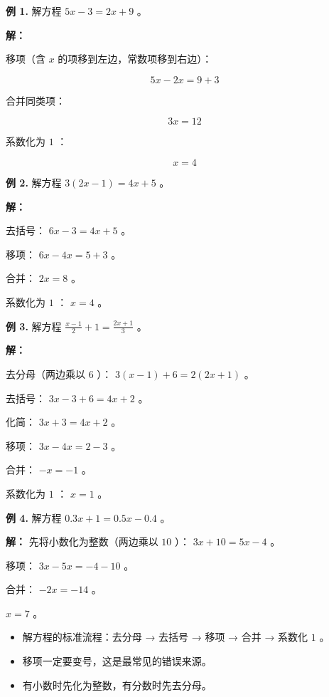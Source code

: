 \begin{workedexamples}


\textbf{例 1.} 解方程 $5x - 3 = 2x + 9$ 。

\textbf{解：}

移项（含 $x$ 的项移到左边，常数项移到右边）：

\[
5x - 2x = 9 + 3
\]


合并同类项：

\[
3x = 12
\]


系数化为 $1$ ：

\[
x = 4
\]


\textbf{例 2.} 解方程 $3(2x - 1) = 4x + 5$ 。

\textbf{解：}

去括号： $6x - 3 = 4x + 5$ 。

移项： $6x - 4x = 5 + 3$ 。

合并： $2x = 8$ 。

系数化为 $1$ ： $x = 4$ 。

\textbf{例 3.} 解方程 $\frac{x - 1}{2} + 1 = \frac{2x + 1}{3}$ 。

\textbf{解：}

去分母（两边乘以 $6$ ）： $3(x - 1) + 6 = 2(2x + 1)$ 。

去括号： $3x - 3 + 6 = 4x + 2$ 。

化简： $3x + 3 = 4x + 2$ 。

移项： $3x - 4x = 2 - 3$ 。

合并： $-x = -1$ 。

系数化为 $1$ ： $x = 1$ 。

\textbf{例 4.} 解方程 $0.3x + 1 = 0.5x - 0.4$ 。

\textbf{解：} 先将小数化为整数（两边乘以 $10$ ）： $3x + 10 = 5x - 4$ 。

移项： $3x - 5x = -4 - 10$ 。

合并： $-2x = -14$ 。

$x = 7$ 。

\end{workedexamples}

\begin{keytakeaway}


\begin{itemize}
  \item 解方程的标准流程：去分母 → 去括号 → 移项 → 合并 → 系数化 $1$ 。
  \item 移项一定要变号，这是最常见的错误来源。
  \item 有小数时先化为整数，有分数时先去分母。
\end{itemize}


\end{keytakeaway}

